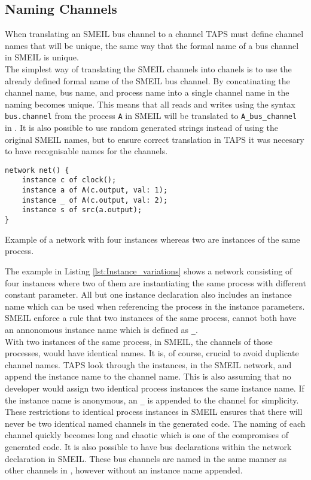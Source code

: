 \subsection{Naming Channels}
When translating an SMEIL bus channel to a \cspm{} channel TAPS must define \cspm{} channel names that will be unique, the same way that the formal name of a bus channel in SMEIL is unique.\\

The simplest way of translating the SMEIL channels into \cspm{} chanels is to use the already defined formal name of the SMEIL bus channel. By concatinating the channel name, bus name, and process name into a single channel name in \cspm{} the naming becomes unique.
This means that all reads and writes using the syntax \texttt{bus.channel} from the process \texttt{A} in SMEIL will be translated to \texttt{A\_bus\_channel} in \cspm{}.
It is also possible to use random generated strings instead of using the original SMEIL names, but to ensure correct translation in TAPS it was necesary to have recognisable names for the \cspm channels.
\begin{listing}
\begin{verbatim}
network net() {
    instance c of clock();
    instance a of A(c.output, val: 1);
    instance _ of A(c.output, val: 2);
    instance s of src(a.output);
}
\end{verbatim}
\caption{Example of a network with four instances whereas two are instances of the same process.}
\label{lst:Instance_variations}
\end{listing}
The example in Listing \ref{lst:Instance_variations} shows a network consisting of four instances where two of them are instantiating the same process with different constant parameter. All but one instance declaration also includes an instance name which can be used when referencing the process in the instance parameters. SMEIL enforce a rule that two instances of the same process, cannot both have an annonomous instance name which is defined as \texttt{\_}.\\

With two instances of the same process, in SMEIL, the \cspm{} channels of those processes, would have identical names. It is, of course, crucial to avoid duplicate channel names. TAPS look through the instances, in the SMEIL network, and append the instance name to the \cspm{} channel name. This is also assuming that no developer would assign two identical process instances the same instance name. If the instance name is anonymous, an \texttt{\_} is appended to the \cspm{} channel for simplicity. These restrictions to identical process instances in SMEIL ensures that there will never be two identical named \cspm{} channels in the generated code. The naming of each channel quickly becomes long and chaotic which is one of the compromises of generated code. It is also possible to have bus declarations within the network declaration in SMEIL. These bus channels are named in the same manner as other channels in \cspm{}, however without an instance name appended.

